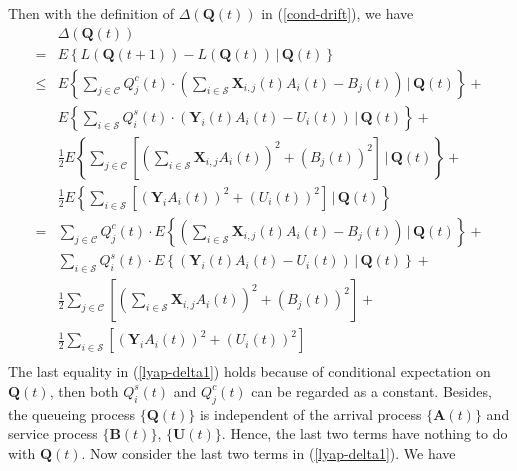 \documentclass[10pt,journal,compsoc]{IEEEtran}
\begin{document}
Then with the definition of $\Delta(\mathbf{Q}(t))$ in (\ref{cond-drift}), we have
\begin{equation}\label{lyap-delta1}
	\begin{array}{cl}
		& \Delta(\mathbf{Q}(t)) \\
		= & E\left\{ L\left(\mathbf{Q}(t+1)\right) - L\left( \mathbf{Q}(t) \right)\,|\,\mathbf{Q}(t) \right\} \\
		\le & \displaystyle E\left\{ \sum_{j \in \mathcal{C}} Q^c_j(t) \cdot \left( 
		\sum_{i \in \mathcal{S}} \mathbf{X}_{i,j}(t) A_i(t) - B_j(t)
		\right) \,|\, \mathbf{Q}(t) \right\} + \\
		  & \displaystyle E\left\{ \sum_{i \in \mathcal{S}} Q^s_i(t) \cdot \left( 
		\mathbf{Y}_{i}(t) A_i(t) - U_i(t)
		\right) \,|\, \mathbf{Q}(t) \right\} + \\
		& \displaystyle \frac{1}{2} E \left\{ \sum_{j \in \mathcal{C}} \left[ \left( \sum_{i \in \mathcal{S}} \mathbf{X}_{i,j} A_i(t) \right)^2  + \left( B_j(t) \right)^2 \right] \,|\,\mathbf{Q}(t) \right\} + \\
		& \displaystyle \frac{1}{2} E \left\{  \sum_{i \in \mathcal{S}} \left[ \left( \mathbf{Y}_{i} A_i(t) \right)^2  + \left( U_i(t) \right)^2 \right] \,|\,\mathbf{Q}(t) \right\} \\
		= & \displaystyle \sum_{j \in \mathcal{C}} Q^c_j(t) \cdot E \left\{ \left( 
		\sum_{i \in \mathcal{S}} \mathbf{X}_{i,j}(t) A_i(t) - B_j(t)
		\right) \,|\, \mathbf{Q}(t) \right\} + \\
		  & \displaystyle \sum_{i \in \mathcal{S}} Q^s_i(t) \cdot E \left\{ \left( 
		\mathbf{Y}_{i}(t) A_i(t) - U_i(t)
		\right) \,|\, \mathbf{Q}(t) \right\} + \\
		& \displaystyle \frac{1}{2} \sum_{j \in \mathcal{C}} \left[ \left( \sum_{i \in \mathcal{S}} \mathbf{X}_{i,j} A_i(t) \right)^2  + \left( B_j(t) \right)^2 \right] + \\
		& \displaystyle \frac{1}{2} \sum_{i \in \mathcal{S}} \left[ \left( \mathbf{Y}_{i} A_i(t) \right)^2  + \left( U_i(t) \right)^2 \right] \\
	\end{array}
\end{equation}
The last equality in (\ref{lyap-delta1}) holds because of conditional expectation on $\mathbf{Q}(t)$, then both $Q_i^s(t)$ and $Q_j^c(t)$ can be regarded as a constant. Besides, the queueing process $\{\mathbf{Q}(t)\}$ is independent of the arrival process $\{\mathbf{A}(t)\}$ and service process $\{\mathbf{B}(t)\}$, $\{\mathbf{U}(t)\}$. Hence, the last two terms have nothing to do with $\mathbf{Q}(t)$. Now consider the last two terms in (\ref{lyap-delta1}). We have
\end{document}
